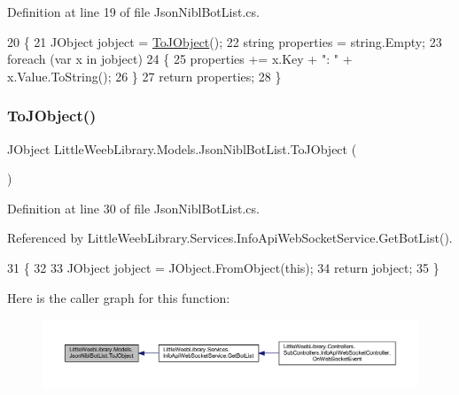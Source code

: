 Definition at line 19 of file Json\+Nibl\+Bot\+List.\+cs.


\begin{DoxyCode}
20         \{
21             JObject jobject = \mbox{\hyperlink{class_little_weeb_library_1_1_models_1_1_json_nibl_bot_list_a6c959577c5cc2851d1a2c830fd6f4961}{ToJObject}}();
22             \textcolor{keywordtype}{string} properties = \textcolor{keywordtype}{string}.Empty;
23             \textcolor{keywordflow}{foreach} (var x \textcolor{keywordflow}{in} jobject)
24             \{
25                 properties += x.Key + \textcolor{stringliteral}{": "} + x.Value.ToString();
26             \}
27             \textcolor{keywordflow}{return} properties;
28         \}
\end{DoxyCode}
\mbox{\label{class_little_weeb_library_1_1_models_1_1_json_nibl_bot_list_a6c959577c5cc2851d1a2c830fd6f4961}} 
\subsubsection{\texorpdfstring{To\+J\+Object()}{ToJObject()}}
{\footnotesize\ttfamily J\+Object Little\+Weeb\+Library.\+Models.\+Json\+Nibl\+Bot\+List.\+To\+J\+Object (\begin{DoxyParamCaption}{ }\end{DoxyParamCaption})}



Definition at line 30 of file Json\+Nibl\+Bot\+List.\+cs.



Referenced by Little\+Weeb\+Library.\+Services.\+Info\+Api\+Web\+Socket\+Service.\+Get\+Bot\+List().


\begin{DoxyCode}
31         \{
32 
33             JObject jobject = JObject.FromObject(\textcolor{keyword}{this});
34             \textcolor{keywordflow}{return} jobject;
35         \}
\end{DoxyCode}
Here is the caller graph for this function\+:\nopagebreak
\begin{figure}[H]
\begin{center}
\leavevmode
\includegraphics[width=350pt]{class_little_weeb_library_1_1_models_1_1_json_nibl_bot_list_a6c959577c5cc2851d1a2c830fd6f4961_icgraph}
\end{center}
\end{figure}


